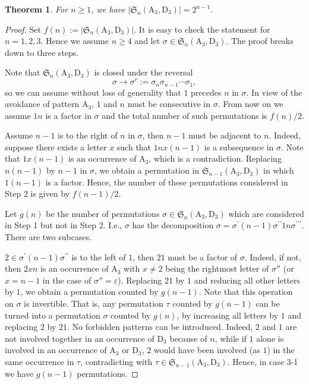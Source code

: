 \documentclass[12pt,reqno]{article}
\numberwithin{equation}{section}
\theoremstyle{plain}
\newtheorem{theorem}{Theorem}[section]
\theoremstyle{definition}
\def\fS{\mathfrak{S}}
\def\rA{\mathrm{A}}
\def\rD{\mathrm{D}}
\begin{document}
\begin{theorem}\label{thm:P3P4}
	For $n\ge 1$, we have $|\fS_n(\rA_3, \rD_3)|=2^{n-1}$.
\end{theorem}

\begin{proof}
	Set $f(n):=|\fS_n(\rA_3, \rD_3)|$. It is easy to check the statement for $n=1, 2, 3$. Hence we assume $n\geq 4$ and let $\sigma\in \fS_n(\rA_3, \rD_3)$. The proof breaks down to three steps.

	 Note that $\fS_n(\rA_3, \rD_3)$ is closed under the reversal 
		$$\sigma\to\sigma^r:=\sigma_n\sigma_{n-1}\cdots\sigma_1,$$ 
		so we can assume without loss of generality that $1$ precedes $n$ in $\sigma$. In view of the avoidance of pattern $\rA_3$, $1$ and $n$ must be consecutive in $\sigma$. From now on we assume $1n$ is a factor in $\sigma$ and the total number of such permutations is $f(n)/2$. 
	\smallskip

	 Assume $n-1$ is to the right of $n$ in $\sigma$, then $n-1$ must be adjacent to $n$. Indeed, suppose there exists a letter $x$ such that $1nx(n-1)$ is a subsequence in $\sigma$. Note that $1x(n-1)$ is an occurrence of $\rA_3$, which is a contradiction. Replacing $n(n-1)$ by $n-1$ in $\sigma$, we obtain a permutation in $\fS_{n-1}(\rA_3, \rD_3)$ in which $1(n-1)$ is a factor. Hence, the number of these permutations considered in Step 2 is given by $f(n-1)/2$.
	\smallskip
		
	 Let $g(n)$ be the number of permutations $\sigma\in \fS_n(\rA_3, \rD_3)$ which are considered in Step 1 but not in Step 2. I.e., $\sigma$ has the decomposition $\sigma=\sigma^{\prime}(n-1)\sigma^{\prime \prime}1n\sigma^{\prime \prime \prime}$. There are two subcases.

   $2\in \sigma^{\prime}(n-1)\sigma^{\prime \prime}$ is to the left of $1$, then $21$ must be a factor of $\sigma$. Indeed, if not, then $2xn$ is an occurrence of $\rA_3$ with $x\neq 2$ being the rightmost letter of $\sigma''$ (or $x=n-1$ in the case of $\sigma''=\varepsilon$). Replacing $21$ by $1$ and reducing all other letters by $1$, we obtain a permutation counted by $g(n-1)$. Note that this operation on $\sigma$ is invertible. That is, any permutation $\tau$ counted by $g(n-1)$ can be turned into a permutation $\sigma$ counted by $g(n)$, by increasing all letters by $1$ and replacing $2$ by $21$. No forbidden patterns can be introduced. Indeed, $2$ and $1$ are not involved together in an occurrence of $\rD_3$ because of $n$, while if $1$ alone is involved in an occurrence of $\rA_3$ or $\rD_3$, $2$ would have been involved (as $1$) in the same occurrence in $\tau$, contradicting with $\tau\in \fS_{n-1}(\rA_3, \rD_3)$. Hence, in case 3-1 we have $g(n-1)$ permutations.


\end{proof}
\end{document}
